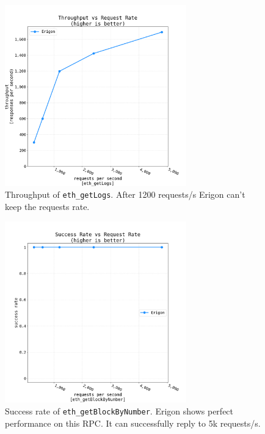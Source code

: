 \begin{figure}[H]
    \centering
    \includegraphics[width=0.7\textwidth]{Figures/results/load_tests/logs/throughput_logs.png}
    \caption{Throughput of {\tt eth\_getLogs}. After 1200 requests/s Erigon can't keep the requests rate. }
    \label{fig:logs-throughput}
\end{figure}

\begin{figure}[H]
    \centering
    \includegraphics[width=0.7\textwidth]{Figures/results/load_tests/blocks/success_rate_blocks.png}
    \caption{Success rate of {\tt eth\_getBlockByNumber}. Erigon shows perfect performance on this RPC. It can successfully reply to 5k requests/s. }
    \label{fig:blocks-success}
\end{figure}

